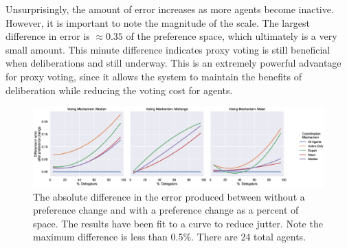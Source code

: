 Unsurprisingly, the amount of error increases as more agents become inactive.
However, it is important to note the magnitude of the scale.
The largest difference in error is $\approx 0.35$ of the preference space,
which ultimately is a very small amount.
This minute difference indicates proxy voting is still beneficial when deliberations
and still underway.
This is an extremely powerful advantage for proxy voting, since it allows the system
to maintain the benefits of deliberation while reducing the voting cost for agents.

\begin{landscape}
    \begin{figure}[p]
        \centering
        \includegraphics[scale=0.55]
        {content/chapter2/figures/abs_diff_from_preference_change_error_as_percent_of_space_abs_mean}
        \caption{
            The absolute difference in the error produced between without a
            preference change and with a preference change as a percent of space.
            The results have been fit to a curve to reduce jutter.
            Note the maximum difference is less than 0.5\%.
            There are 24 total agents.
        }
        \label{fig:\chptindicator-abs-diff-from-preference-change-error-as-percent-of-space-abs-mean}
    \end{figure}
\end{landscape}

